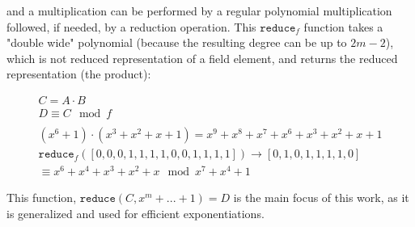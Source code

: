 and a multiplication can be performed by a regular polynomial multiplication followed, if needed, by a reduction operation. This $\texttt{reduce}_f$ function takes a "double wide" polynomial (because the resulting degree can be up to $2m-2$), which is not reduced representation of a field element, and returns the reduced representation (the product):

\begin{gather*}
C = A \cdot B\\
D \equiv C \mod f\\
\\
(x^6+1) \cdot (x^3+x^2+x+1) = x^9 + x^8 + x^7 + x^6 + x^3 + x^2 + x + 1 \\
\texttt{reduce}_f([0, 0, 0, 1, 1, 1, 1, 0, 0, 1, 1, 1, 1]) \rightarrow [0, 1, 0, 1, 1, 1, 1, 0]\\
\equiv x^6 + x^4 + x^3 + x^2 + x \mod x^7+x^4+1
\end{gather*}

This function, $\texttt{reduce}(C, x^m+...+1) = D$ is the main focus of this work, as it is generalized and used for efficient exponentiations.


